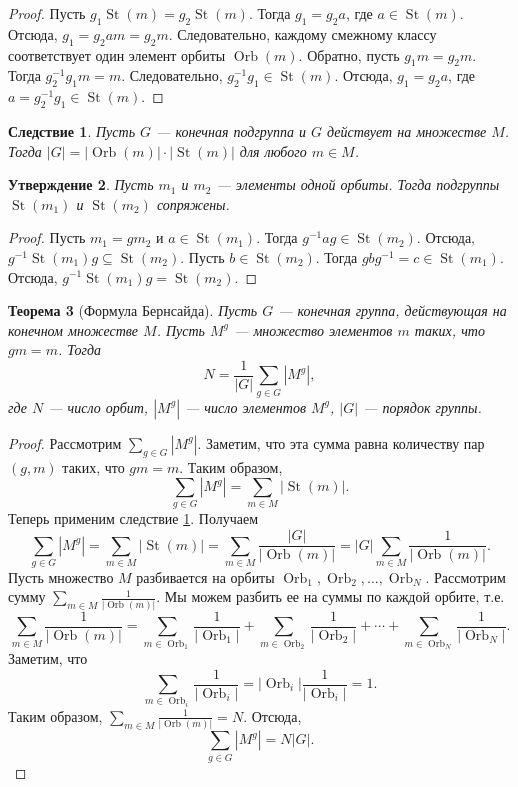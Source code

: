 \documentclass[12pt, titlepage, oneside]{amsbook}
\newcommand{\St}{\operatorname{St}}
\newcommand{\Orb}{\operatorname{Orb}}
\newtheorem{theorem}{Теорема}[chapter]
\newtheorem{corollary}[theorem]{Следствие}
\newtheorem{claim}[theorem]{Утверждение}
\theoremstyle{definition}
\theoremstyle{remark}
\begin{document}
\begin{proof}
	Пусть $g_1\St(m)=g_2\St(m)$. Тогда $g_1=g_2a$, где $a\in\St(m)$.
	Отсюда, $g_1=g_2am=g_2m$. Следовательно, каждому смежному классу
	соответствует один элемент орбиты $\Orb(m)$. Обратно, пусть
	$g_1m=g_2m$. Тогда $g_{2}^{-1}g_1m=m$. Следовательно,
	$g_{2}^{-1}g_1\in\St(m)$. Отсюда, $g_1=g_2a$, где
	$a=g_{2}^{-1}g_1\in\St(m)$.
\end{proof}

\begin{corollary}
	\label{Gr3} Пусть $G$ --- конечная подгруппа и $G$ действует на
	множестве $M$. Тогда $|G|=|\Orb(m)|\cdot|\St(m)|$ для любого $m\in
		M$.
\end{corollary}

\begin{claim}
	Пусть $m_1$ и $m_2$ --- элементы одной орбиты. Тогда подгруппы
	$\St(m_1)$ и $\St(m_2)$ сопряжены.
\end{claim}

\begin{proof}
	Пусть $m_1=gm_2$ и $a\in\St(m_1)$. Тогда $g^{-1}ag\in\St(m_2)$.
	Отсюда, $g^{-1}\St(m_1)g\subseteq\St(m_2)$. Пусть $b\in\St(m_2)$.
	Тогда $gbg^{-1}=c\in\St(m_1)$. Отсюда, $g^{-1}\St(m_1)g=\St(m_2)$.
\end{proof}

\begin{theorem}[Формула
		Бернсайда]
	\label{Gr4}
	Пусть $G$ --- конечная группа, действующая на конечном множестве $M$. Пусть $M^g$ --- множество элементов $m$ таких, что $gm=m$. Тогда $$N=\frac{1}{|G|}\sum\limits_{g\in G} |M^g|,$$ где $N$ --- число орбит, $|M^g|$ --- число элементов $M^g$, $|G|$ --- порядок группы.
\end{theorem}

\begin{proof}
	Рассмотрим $\sum\limits_{g\in G} |M^g|$. Заметим, что эта сумма равна количеству пар $(g,m)$ таких, что $gm=m$. Таким образом, $$\sum\limits_{g\in G} |M^g|=\sum\limits_{m\in M} |\St(m)|.$$ Теперь применим следствие \ref{Gr3}. Получаем $$\sum\limits_{g\in G} |M^g|=\sum\limits_{m\in M} |\St(m)|=\sum\limits_{m\in M}\frac{|G|}{|\Orb(m)|}=|G|\sum\limits_{m\in M}\frac{1}{|\Orb(m)|}.$$ Пусть множество $M$ разбивается на орбиты $\Orb_1,\Orb_2,\ldots,\Orb_N$. Рассмотрим сумму $\sum\limits_{m\in M}\frac{1}{|\Orb(m)|}.$ Мы можем разбить ее на суммы по каждой орбите, т.е. $$\sum\limits_{m\in M}\frac{1}{|\Orb(m)|}=\sum\limits_{m\in \Orb_1}\frac{1}{|\Orb_1|}+\sum\limits_{m\in \Orb_2}\frac{1}{|\Orb_2|}+\cdots+\sum\limits_{m\in \Orb_N}\frac{1}{|\Orb_N|}.$$ Заметим, что $$\sum\limits_{m\in \Orb_i}\frac{1}{|\Orb_i|}=|\Orb_i|\frac{1}{|\Orb_i|}=1.$$ Таким образом, $\sum\limits_{m\in M}\frac{1}{|\Orb(m)|}=N.$ Отсюда, $$\sum\limits_{g\in G} |M^g|=N|G|.$$
\end{proof}
\end{document}
